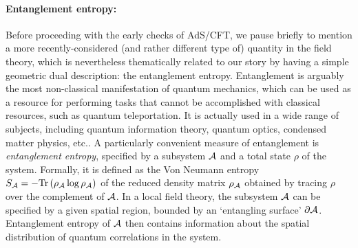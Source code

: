 \documentclass[12pt]{article}
\def\AC{AdS/CFT}
\begin{document}
\paragraph{Entanglement entropy:}  %
Before proceeding with the early checks of \AC, we pause briefly to mention a more recently-considered (and rather different type of) quantity in the field theory, which is nevertheless thematically related to our story by having a simple geometric dual description: the entanglement entropy. Entanglement is arguably the most non-classical manifestation of quantum mechanics, 
which can be used as a resource for performing tasks that cannot be accomplished with classical resources, such as quantum teleportation.  It is actually used in a wide range of subjects, including quantum information theory, quantum optics, condensed matter physics, etc..  
A particularly convenient measure of entanglement is {\it entanglement entropy}, specified by a subsystem ${\cal A}$ and a total state $\rho$ of the system.  Formally, it is defined as the Von Neumann entropy $S_{{\cal A}} = - {\rm Tr} \left( \rho_{{\cal A}} \log \rho_{{\cal A}}\right)$ of the reduced density matrix $\rho_{{\cal A}}$ obtained by tracing $\rho$ over the complement of ${\cal A}$.  
In a local field theory, the subsystem ${\cal A}$ can be specified by a given spatial region, bounded by an `entangling surface' $\partial {\cal A}$.  Entanglement entropy of ${\cal A}$ then contains information  about the spatial distribution of quantum correlations in the system.
\end{document}
